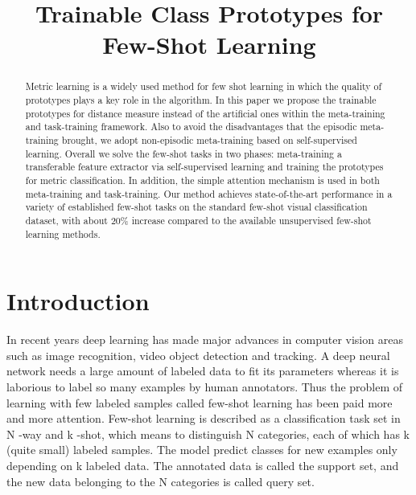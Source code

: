 \documentclass[conference]{IEEEtran}
\begin{document}
\title{Trainable Class Prototypes for Few-Shot Learning \\
}

\author{
\and
{}
}

\maketitle

\begin{abstract}
Metric learning is a widely used method for few shot learning in which the quality of prototypes plays a key role in the algorithm. In this paper we propose the trainable prototypes for distance measure instead of the artificial ones within the meta-training and task-training framework. Also to avoid the disadvantages that the episodic meta-training brought, we adopt non-episodic meta-training based on self-supervised learning. Overall we solve the few-shot tasks in two phases: meta-training a transferable feature extractor via self-supervised learning and training the prototypes for metric classification. In addition, the simple attention mechanism is used in both meta-training and task-training. Our method achieves state-of-the-art performance in a variety of established few-shot tasks on the standard few-shot visual classiﬁcation dataset, with about 20\% increase compared to the available unsupervised few-shot learning methods.
\end{abstract}

\section{Introduction}
In recent years deep learning has made major advances in computer vision areas such as image recognition, video object detection and tracking. A deep neural network needs a large amount of labeled data to fit its parameters whereas it is laborious to label so many examples by human annotators. Thus the problem of learning with few labeled samples called few-shot learning has been paid more and more attention. Few-shot learning is described as a classification task set in N -way and k -shot, which means to distinguish N categories, each of which has k (quite small) labeled samples. The model predict classes for new examples only depending on k labeled data. The annotated data is called the support set, and the new data belonging to the N categories is called query set.
\end{document}
